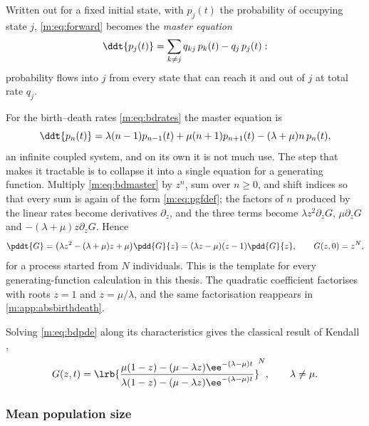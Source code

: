 Written out for a fixed initial state, with $p_j(t)$ the probability of occupying
state $j$, \cref{m:eq:forward} becomes the \emph{master equation}
\begin{equation}
\label{m:eq:master}
\ddt{p_j(t)} = \sum_{k\neq j}q_{kj}\,p_k(t) - q_j\,p_j(t) :
\end{equation}
probability flows into $j$ from every state that can reach it and out of $j$ at
total rate $q_j$.

For the birth--death rates \cref{m:eq:bdrates} the master equation is
\begin{equation}
\label{m:eq:bdmaster}
\ddt{p_n(t)} = \lambda(n-1)p_{n-1}(t) + \mu(n+1)p_{n+1}(t) - (\lambda+\mu)n\,p_n(t),
\end{equation}
an infinite coupled system, and on its own it is not much use. The step that makes
it tractable is to collapse it into a single equation for a generating function.
Multiply \cref{m:eq:bdmaster} by $z^n$, sum over $n\ge0$, and shift indices so that
every sum is again of the form \cref{m:eq:pgfdef}; the factors of $n$ produced by
the linear rates become derivatives $\partial_z$, and the three terms become
$\lambda z^2\partial_zG$, $\mu\partial_zG$ and $-(\lambda+\mu)z\partial_zG$. Hence
\begin{equation}
\label{m:eq:bdpde}
\pddt{G} = \bigl(\lambda z^2-(\lambda+\mu)z+\mu\bigr)\pdd{G}{z}
= (\lambda z-\mu)(z-1)\pdd{G}{z},
\qquad
G(z,0)=z^N ,
\end{equation}
for a process started from $N$ individuals. This is the template for every
generating-function calculation in this thesis. The quadratic coefficient
factorises with roots $z=1$ and $z=\mu/\lambda$, and the same factorisation
reappears in \cref{m:app:absbirthdeath}.

Solving \cref{m:eq:bdpde} along its characteristics gives the classical result of
Kendall \cite{Kendall1948},
\begin{equation}
\label{m:eq:bdsolution}
G(z,t) = \lrb{\frac{\mu(1-z)-(\mu-\lambda z)\ee^{-(\lambda-\mu)t}}
{\lambda(1-z)-(\mu-\lambda z)\ee^{-(\lambda-\mu)t}}}^{\!N},
\qquad\lambda\neq\mu .
\end{equation}

\subsubsection{Mean population size}
\label{m:sec:mean}

